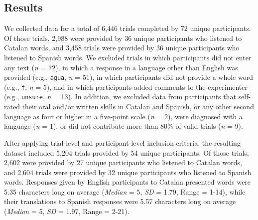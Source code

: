 \documentclass[
]{article}
\begin{document}
\subsection{Results}\label{results}

We collected data for a total of 6,446 trials completed by 72 unique
participants. Of those trials, 2,988 were provided by 36 unique
participants who listened to Catalan words, and 3,458 trials were
provided by 36 unique participants who listened to Spanish words. We
excluded trials in which participants did not enter any text (\emph{n} =
72), in which a response in a language other than English was provided
(e.g., \texttt{agua}, \emph{n} = 51), in which participants did not
provide a whole word (e.g., \texttt{f}, \emph{n} = 5), and in which
participants added comments to the experimenter (e.g., \texttt{unsure},
\emph{n} = 13). In addition, we excluded data from participants that
self-rated their oral and/or written skills in Catalan and Spanish, or
any other second language as four or higher in a five-point scale
(\emph{n} = 2), were diagnosed with a language (\emph{n} = 1), or did
not contribute more than 80\% of valid trials (\emph{n} = 9).

After applying trial-level and participant-level inclusion criteria, the
resulting dataset included 5,204 trials provided by 54 unique
participants. Of those trials, 2,602 were provided by 27 unique
participants who listened to Catalan words, and 2,604 trials were
provided by 32 unique participants who listened to Spanish words.
Responses given by English participants to Catalan presented words were
5.35 characters long on average (\emph{Median} = 5, \emph{SD} = 1.79,
Range = 1-14), while their translations to Spanish responses were 5.57
characters long on average (\emph{Median} = 5, \emph{SD} = 1.97, Range =
2-21).
\end{document}
